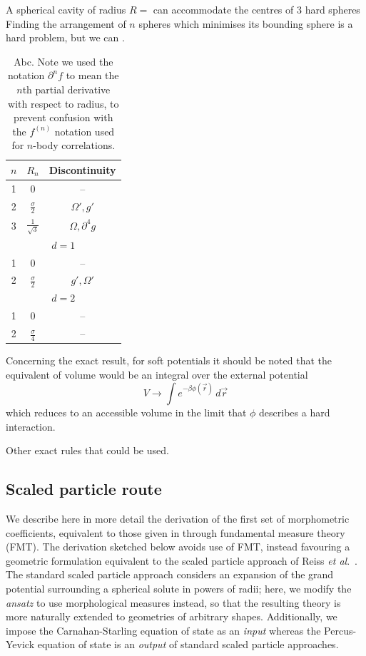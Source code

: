 \documentclass[12pt]{report}
\begin{document}
A spherical cavity of radius $R=$ can accommodate the centres of 3 hard spheres
Finding the arrangement of $n$ spheres which minimises its bounding sphere is a hard problem, but we can .
\begin{table}
  \begin{minipage}[b]{\linewidth}
  \centering
  \begin{tabular}{ccc}
    \toprule
    $n$ & $R_n$ & Discontinuity \\
    \midrule
    1 & 0 & -- \\
    2 & $\frac{\sigma}{2}$ & $\Omega', g'$ \\
    3 & $\frac{1}{\sqrt{3}}$ & $\Omega, \partial^4 g$ \\
    \multicolumn{3}{c}{$d = 1$} \\
    \midrule
    1 & 0 & -- \\
    2 & $\frac{\sigma}{2}$ & $g', \Omega'$ \\
    \midrule
    \multicolumn{3}{c}{$d = 2$} \\
    \midrule
    1 & 0 & -- \\
    2 & $\frac{\sigma}{4}$ & -- \\
    \bottomrule
  \end{tabular}
  \end{minipage}
  \caption{Abc.
    Note we used the notation $\partial^n f$ to mean the $n$th partial derivative with respect to radius, to prevent confusion with the $f^{(n)}$ notation used for $n$-body correlations.}
\end{table}

Concerning the exact result, for soft potentials it should be noted that the equivalent of volume would be an integral over the external potential
\begin{equation}
  V \to \int e^{-\beta \phi(\vec{r})} \, d\vec{r}
\end{equation}
which reduces to an accessible volume in the limit that $\phi$ describes a hard interaction.

Other exact rules that could be used.

\subsection{Scaled particle route}

We describe here in more detail the derivation of the first set of morphometric coefficients, equivalent to those given in \cite{Hansen-Goos2006} through fundamental measure theory (FMT).
The derivation sketched below avoids use of FMT, instead favouring a geometric formulation equivalent to the scaled particle approach of Reiss \emph{et al}.\ \cite{Reiss1959,Reiss1960}.
The standard scaled particle approach considers an expansion of the grand potential surrounding a spherical solute in powers of radii; here, we modify the \emph{ansatz} to use morphological measures instead, so that the resulting theory is more naturally extended to geometries of arbitrary shapes.
Additionally, we impose the Carnahan-Starling equation of state as an \emph{input} whereas the Percus-Yevick equation of state is an \textit{output} of standard scaled particle approaches.
\end{document}

